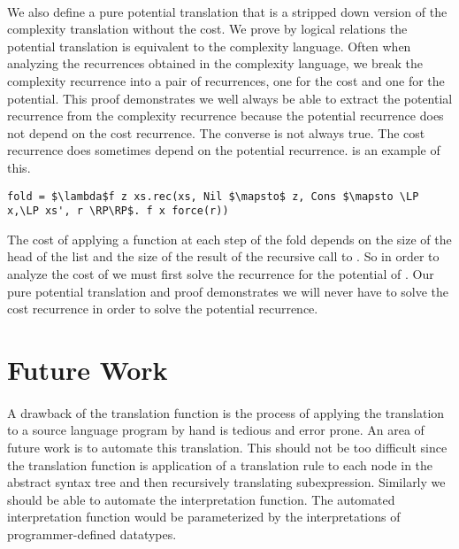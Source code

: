 \paragraph{}
We also define a pure potential translation that is a stripped down version of
the complexity translation without the cost. We prove by logical relations the
potential translation is equivalent to the complexity language. Often when
analyzing the recurrences obtained in the complexity language, we break the
complexity recurrence into a pair of recurrences, one for the cost and one for
the potential. This proof demonstrates we well always be able to extract the
potential recurrence from the complexity recurrence because the potential
recurrence does not depend on the cost recurrence. The converse is not always
true. The cost recurrence does sometimes depend on the potential recurrence.
 is an example of this.
%
\begin{lstlisting}
fold = $\lambda$f z xs.rec(xs, Nil $\mapsto$ z, Cons $\mapsto \LP x,\LP xs', r \RP\RP$. f x force(r))
\end{lstlisting}
%
The cost of applying a function  at each
step of the fold depends on the size of the head of the list and the size of
the result of the recursive call to . So in order to analyze the cost
of  we must first solve the recurrence for the potential of .
Our pure potential translation and proof demonstrates we will never have to
solve the cost recurrence in order to solve the potential recurrence.

\section{Future Work}
\paragraph{}
A drawback of the translation function is the process of applying the
translation to a source language program by hand is tedious and error prone. An
area of future work is to automate this translation. This should not be too
difficult since the translation function is application of a translation rule
to each node in the abstract syntax tree and then recursively translating
subexpression. Similarly we should be able to automate the interpretation
function. The automated interpretation function would be parameterized by the
interpretations of programmer-defined datatypes.

